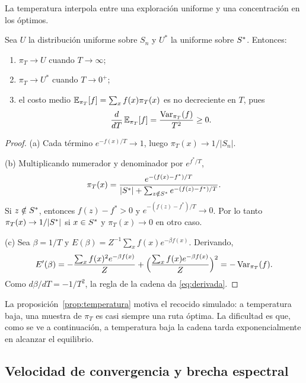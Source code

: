 La temperatura interpola entre una exploración uniforme y una
concentración en los óptimos.

\begin{proposicion}
\label{prop:temperatura}
Sea \(U\) la distribución uniforme sobre \(S_n\) y \(U^\ast\) la
uniforme sobre \(S^{\ast}\). Entonces:
\begin{enumerate}[label=(\alph*)]
    \item \(\pi_T\to U\) cuando \(T\to\infty\);
    \item \(\pi_T\to U^\ast\) cuando \(T\to 0^+\);
    \item el costo medio \(\mathbb{E}_{\pi_T}[f]=\sum_x f(x)\pi_T(x)\) es no
    decreciente en \(T\), pues
    \begin{equation}
    \label{eq:derivada}
    \frac{d}{dT}\,\mathbb{E}_{\pi_T}[f]=\frac{\operatorname{Var}_{\pi_T}(f)}{T^2}\ge 0.
    \end{equation}
\end{enumerate}
\end{proposicion}

\begin{proof}
(a) Cada término \(e^{-f(x)/T}\to 1\), luego \(\pi_T(x)\to1/|S_n|\).

(b) Multiplicando numerador y denominador por \(e^{f^\ast/T}\),
\[
\pi_T(x)=\frac{e^{-(f(x)-f^\ast)/T}}{|S^{\ast}|+\sum_{z\notin S^{\ast}}e^{-(f(z)-f^\ast)/T}}.
\]
Si \(z\notin S^{\ast}\), entonces \(f(z)-f^\ast>0\) y
\(e^{-(f(z)-f^\ast)/T}\to 0\). Por lo tanto \(\pi_T(x)\to1/|S^{\ast}|\) si
\(x\in S^{\ast}\) y \(\pi_T(x)\to 0\) en otro caso.

(c) Sea \(\beta=1/T\) y
\(E(\beta)=Z^{-1}\sum_x f(x)e^{-\beta f(x)}\). Derivando,
\[
E'(\beta)=-\frac{\sum_x f(x)^2e^{-\beta f(x)}}{Z}
+\Bigl(\frac{\sum_x f(x)e^{-\beta f(x)}}{Z}\Bigr)^2
=-\operatorname{Var}_{\pi_T}(f).
\]
Como \(d\beta/dT=-1/T^2\), la regla de la cadena da
\eqref{eq:derivada}.
\end{proof}

La proposición~\ref{prop:temperatura} motiva el recocido simulado: a
temperatura baja, una muestra de \(\pi_T\) es casi siempre una ruta
óptima. La dificultad es que, como se ve a continuación, a temperatura
baja la cadena tarda exponencialmente en alcanzar el equilibrio.

\subsection{Velocidad de convergencia y brecha espectral}
\label{subsec:brecha}

